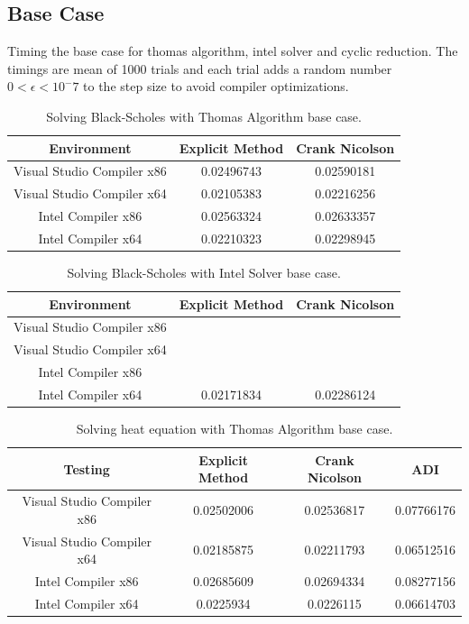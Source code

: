 \documentclass[12pt, oneside]{book}
\theoremstyle{plain}
\theoremstyle{definition}
\begin{document}
\subsection{Base Case}
Timing the base case for thomas algorithm, intel solver and cyclic reduction. The timings are mean of 1000 trials and each trial adds a random number $ 0 < \epsilon < 10^-7 $ to the step size to avoid compiler optimizations.

\begin{table}[h!]
\centering
 \begin{tabular}{||c c c||} 
 \hline
 Environment & Explicit Method & Crank Nicolson\\ [0.5ex] 
 \hline\hline\hline
 Visual Studio Compiler x86 & 0.02496743 & 0.02590181 \\ 
 Visual Studio Compiler x64 & 0.02105383 & 0.02216256 \\
 Intel Compiler x86 & 0.02563324 & 0.02633357 \\
 Intel Compiler x64 & 0.02210323 & 0.02298945\\ [1ex] 
 \hline
 \end{tabular}
 \caption{Solving Black-Scholes with Thomas Algorithm base case.}
\end{table}

\begin{table}[h!]
\centering
 \begin{tabular}{||c c c||} 
 \hline
 Environment & Explicit Method & Crank Nicolson\\ [0.5ex] 
 \hline\hline\hline
 Visual Studio Compiler x86 &  \\ 
 Visual Studio Compiler x64 & \\
 Intel Compiler x86 & \\
 Intel Compiler x64 & 0.02171834 & 0.02286124\\ [1ex] 
 \hline
 \end{tabular}
 \caption{Solving Black-Scholes with Intel Solver base case.}
\end{table}

\begin{table}[htp!]
\centering
 \begin{tabular}{||c c c c||} 
 \hline
 Testing & Explicit Method & Crank Nicolson & ADI\\ [0.5ex] 
 \hline\hline\hline
 Visual Studio Compiler x86 & 0.02502006 & 0.02536817 & 0.07766176 \\ 
 Visual Studio Compiler x64 & 0.02185875 & 0.02211793 & 0.06512516 \\
 Intel Compiler x86 & 0.02685609 & 0.02694334 & 0.08277156\\
 Intel Compiler x64 & 0.0225934 & 0.0226115 & 0.06614703\\[1ex] 
 \hline
 \end{tabular}
 \caption{Solving heat equation with Thomas Algorithm base case.}
\end{table}
 
\end{document}
